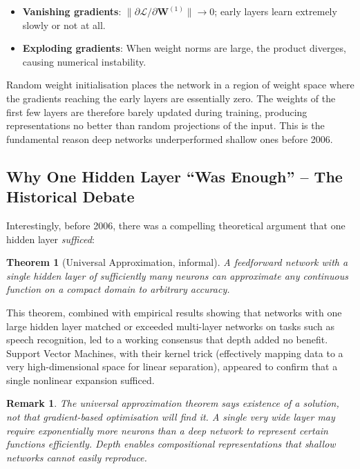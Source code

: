 \documentclass[12pt,a4paper]{article}
\newtheorem{theorem}{Theorem}[section]
\newtheorem{remark}{Remark}[section]
\newcommand{\W}{\mathbf{W}}
\newcommand{\loss}{\mathcal{L}}
\begin{document}
\begin{itemize}[leftmargin=*]
  \item \textbf{Vanishing gradients}: $\|\partial \loss / \partial \W^{(1)}\|
        \to 0$; early layers learn extremely slowly or not at all.
  \item \textbf{Exploding gradients}: When weight norms are large,
        the product diverges, causing numerical instability.
\end{itemize}

\begin{warningbox}
  Random weight initialisation places the network in a region of weight space
  where the gradients reaching the early layers are essentially zero.  The
  weights of the first few layers are therefore barely updated during training,
  producing representations no better than random projections of the input.
  This is the fundamental reason deep networks underperformed shallow ones
  before 2006.
\end{warningbox}

\subsection{Why One Hidden Layer ``Was Enough'' -- The Historical Debate}

Interestingly, before 2006, there was a compelling theoretical argument that
one hidden layer \emph{sufficed}:

\begin{theorem}[Universal Approximation, informal]
\label{thm:ua}
  A feedforward network with a single hidden layer of sufficiently many
  neurons can approximate any continuous function on a compact domain to
  arbitrary accuracy.
\end{theorem}

This theorem, combined with empirical results showing that networks with one
large hidden layer matched or exceeded multi-layer networks on tasks such as
speech recognition, led to a working consensus that depth added no benefit.
Support Vector Machines, with their kernel trick (effectively mapping data to
a very high-dimensional space for linear separation), appeared to confirm that
a single nonlinear expansion sufficed.

\begin{remark}
  The universal approximation theorem says \emph{existence} of a solution, not
  that gradient-based optimisation will \emph{find} it.  A single very wide
  layer may require exponentially more neurons than a deep network to represent
  certain functions efficiently.  Depth enables compositional representations
  that shallow networks cannot easily reproduce.
\end{remark}
\end{document}
